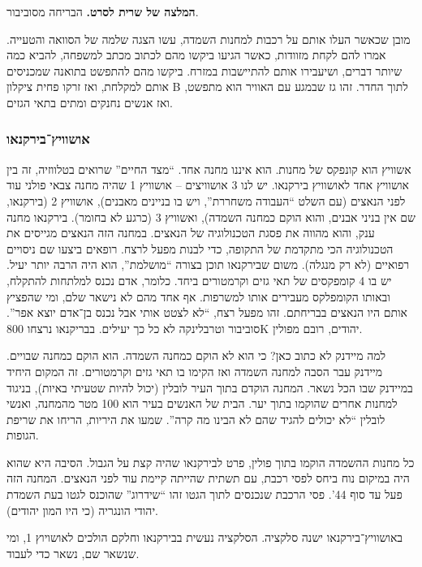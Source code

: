 \documentclass[]{article}
\theoremstyle{definition}
\begin{document}
	\textbf{המלצה של שרית לסרט. }הבריחה מסוביבור. 
	
	
	מובן שכאשר העלו אותם על רכבות למחנות השמדה, עשו הצגה שלמה של הסוואה והטעייה. אמרו להם לקחת מזוודות, כאשר הגיעו ביקשו מהם לכתוב מכתב למשפחה, להביא כמה שיותר דברים, ושיעבירו אותם להתיישבות במזרח. ביקשו מהם להתפשט בתואנה שמכניסים אותם למקלחת, ואז זרקו פחית ציקלון B לתוך החדר. זהו גז שבמגע עם האוויר הוא מתפשט, ואז אנשים נחנקים ומתים בתאי הגזים. 
	
	\subsubsection{אושוויץ־בירקנאו}
	אשוויץ הוא קונפקס של מחנות. הוא איננו מחנה אחד. ``מצד החיים'' שרואים בטלווזיה, זה בין אושוויץ אחד לאושוויץ בירקנאו. יש לנו 3 אושוויצים – אושוויץ 1 שהיה מחנה צבאי פולני עוד לפני הנאצים (עם השלט ``העבודה משחררת'', ויש בו בניינים מאבנים), אושוויץ 2 (בירקנאו, שם אין בניני אבנים, והוא הוקם כמחנה השמדה), ואשוויץ 3 (כרגע לא בחומר). בירקנאו מחנה ענק, והוא מהווה את פסגת הטכנולוגיה של הנאצים. במחנה הזה הנאצים מגייסים את הטכנולוגיה הכי מתקדמת של התקופה, כדי לבנות מפעל לרצח. רופאים ביצעו שם ניסויים רפואיים (לא רק מנגלה). משום שבירקנאו תוכן בצורה ``מושלמת'', הוא היה הרבה יותר יעיל. יש בו 4 קומפקסים של תאי גזים וקרמטורים ביחד. כלומר, אדם נכנס למלתחות להתקלח, ובאותו הקומפלקס מעבירים אותו למשרפות. אף אחד מהם לא נישאר שלם, ומי שהפציץ אותם היו הנאצים בבריחתם. זהו מפעל רצח, ``לא לצטט אותי אבל נכנס בן־אדם יוצא אפר''. סוביבור וטרבלינקה לא כל כך יעילים. בבריקנאו נרצחו 800K יהודים, רובם מפולין. 
	
	למה מיידנק לא כתוב כאן? כי הוא לא הוקם כמחנה השמדה. הוא הוקם כמחנה שבויים. מיידנק עבר הסבה למחנה השמדה ואז הקימו בו תאי גזים וקרמטורים. זה המקום היחיד במיידנק שבו הכל נשאר. המחנה הוקדם בתוך העיר לובלין (יכול להיות שטעיתי באיות), בניגוד למחנות אחרים שהוקמו בתוך יער. הבית של האנשים בעיר הוא 100 מטר מהמחנה, ואנשי לובלין ``לא יכולים להגיד שהם לא הבינו מה קרה''. שמעו את היריות, הריחו את שריפת הגופות. 
	
	
	כל מחנות ההשמדה הוקמו בתוך פולין, פרט לבירקנאו שהיה קצת על הגבול. הסיבה היא שהוא היה במיקום נוח ביחס לפסי רכבת, עם תשתית שהייתה קיימת עוד לפני הנאצים. המחנה הזה פעל עד סוף 44'. פסי הרכבת שנכנסים לתוך הגטו זהו ``שידרוג'' שהוכנס לגטו בעת השמדת יהודי הונגריה (כי היו המון יהודים). 
	
	באושוויץ־בירקנאו ישנה סלקציה. הסלקציה נעשית בבירקנאו וחלקם הולכים לאושויוץ 1, ומי שנשאר שם, נשאר כדי לעבוד. 
	
\end{document}
